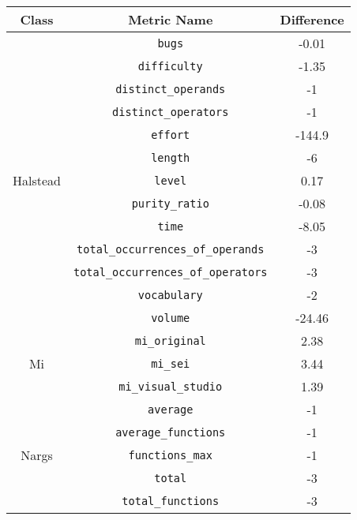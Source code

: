 \begin{center}
  \begin{tabular}{ |c|c|c| }
    \hline

    Class & Metric Name                           & Difference \\

    \hline

    \multirow{ 13 }{6em}{ Halstead }
          & \verb|bugs|                           & -0.01      \\
          & \verb|difficulty|                     & -1.35      \\
          & \verb|distinct_operands|              & -1         \\
          & \verb|distinct_operators|             & -1         \\
          & \verb|effort|                         & -144.9     \\
          & \verb|length|                         & -6         \\
          & \verb|level|                          & 0.17       \\
          & \verb|purity_ratio|                   & -0.08      \\
          & \verb|time|                           & -8.05      \\
          & \verb|total_occurrences_of_operands|  & -3         \\
          & \verb|total_occurrences_of_operators| & -3         \\
          & \verb|vocabulary|                     & -2         \\
          & \verb|volume|                         & -24.46     \\
    \hline
    \multirow{ 3 }{6em}{ Mi }
          & \verb|mi_original|                    & 2.38       \\
          & \verb|mi_sei|                         & 3.44       \\
          & \verb|mi_visual_studio|               & 1.39       \\
    \hline
    \multirow{ 5 }{6em}{ Nargs }
          & \verb|average|                        & -1         \\
          & \verb|average_functions|              & -1         \\
          & \verb|functions_max|                  & -1         \\
          & \verb|total|                          & -3         \\
          & \verb|total_functions|                & -3         \\
    \hline
  \end{tabular}
\end{center}
